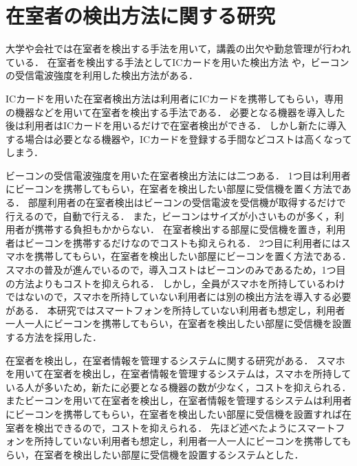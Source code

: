 \section{在室者の検出方法に関する研究}\label{2.2}
大学や会社では在室者を検出する手法を用いて，講義の出欠\cite{smartphone}\cite{nfcandroid}\cite{android}\cite{smartbase}\cite{garake}や勤怠管理\cite{amano}が行われている．
在室者を検出する手法としてICカードを用いた検出方法
\cite{zyugyou}
\cite{felica}
\cite{densi}
\cite{notouchic}
\cite{felicaweb}
\cite{suica}
や，ビーコンの受信電波強度を利用した検出方法\cite{bledakoku}\cite{blesuitei}がある．

ICカードを用いた在室者検出方法は利用者にICカードを携帯してもらい，専用の機器などを用いて在室者を検出する手法である．
必要となる機器を導入した後は利用者はICカードを用いるだけで在室者検出ができる．
しかし新たに導入する場合は必要となる機器や，ICカードを登録する手間などコストは高くなってしまう．

ビーコンの受信電波強度を用いた在室者検出方法には二つある．
1つ目は利用者にビーコンを携帯してもらい，在室者を検出したい部屋に受信機を置く方法である．
部屋利用者の在室者検出はビーコンの受信電波を受信機が取得するだけで行えるので，自動で行える．
また，ビーコンはサイズが小さいものが多く，利用者が携帯する負担もかからない．
在室者検出する部屋に受信機を置き，利用者はビーコンを携帯するだけなのでコストも抑えられる．
2つ目に利用者にはスマホを携帯してもらい，在室者を検出したい部屋にビーコンを置く方法である．
スマホの普及が進んでいる\cite{hukyu}ので，導入コストはビーコンのみであるため，1つ目の方法よりもコストを抑えられる．
しかし，全員がスマホを所持しているわけではないので，スマホを所持していない利用者には別の検出方法を導入する必要がある．
本研究ではスマートフォンを所持していない利用者も想定し，利用者一人一人にビーコンを携帯してもらい，在室者を検出したい部屋に受信機を設置する方法を採用した．


在室者を検出し，在室者情報を管理するシステムに関する研究がある\cite{smartphoneAndRoom}\cite{laboratory}\cite{prep}．
スマホを用いて在室者を検出し，在室者情報を管理するシステムは，スマホを所持している人が多いため，新たに必要となる機器の数が少なく，コストを抑えられる\cite{smartphoneAndRoom}．
またビーコンを用いて在室者を検出し，在室者情報を管理するシステムは利用者にビーコンを携帯してもらい，在室者を検出したい部屋に受信機を設置すれば在室者を検出できるので，コストを抑えられる\cite{laboratory}\cite{prep}．
先ほど述べたようにスマートフォンを所持していない利用者も想定し，利用者一人一人にビーコンを携帯してもらい，在室者を検出したい部屋に受信機を設置するシステムとした．

